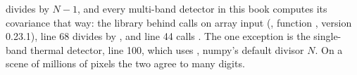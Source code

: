 \begin{sourcenote}
 divides by $N-1$, and every multi-band detector in this book computes its
covariance that way: the  library behind  calls 
on array input (, function , version 0.23.1),
 line 68 divides by , and
 line 44 calls . The one
exception is the single-band thermal detector,
 line 100, which uses , numpy's
default divisor $N$. On a scene of millions of pixels the two agree to many digits.
\end{sourcenote}

